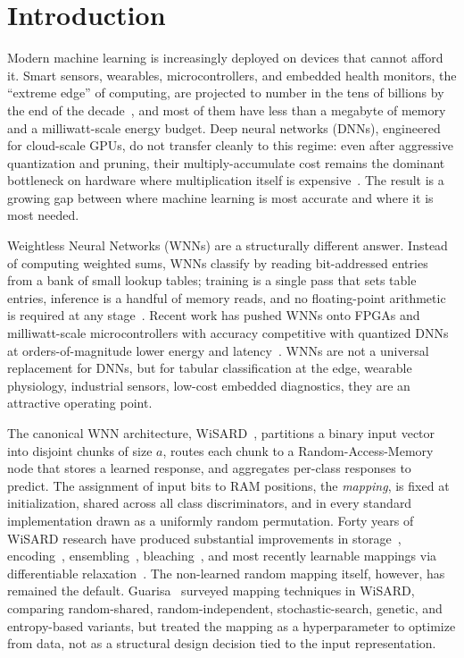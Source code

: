 
\section{Introduction}
\label{sec:introduction}

Modern machine learning is increasingly deployed on devices that cannot afford it. Smart sensors, wearables, microcontrollers, and embedded health monitors, the ``extreme edge'' of computing, are projected to number in the tens of billions by the end of the decade~\cite{tinyml-survey}, and most of them have less than a megabyte of memory and a milliwatt-scale energy budget. Deep neural networks (DNNs), engineered for cloud-scale GPUs, do not transfer cleanly to this regime: even after aggressive quantization and pruning, their multiply-accumulate cost remains the dominant bottleneck on hardware where multiplication itself is expensive~\cite{efficient_dl}. The result is a growing gap between where machine learning is most accurate and where it is most needed.

Weightless Neural Networks (WNNs) are a structurally different answer. Instead of computing weighted sums, WNNs classify by reading bit-addressed entries from a bank of small lookup tables; training is a single pass that sets table entries, inference is a handful of memory reads, and no floating-point arithmetic is required at any stage~\cite{aleksander1984wisard}. Recent work has pushed WNNs onto FPGAs and milliwatt-scale microcontrollers with accuracy competitive with quantized DNNs at orders-of-magnitude lower energy and latency~\cite{susskind2022bthowen,susskind2023uleen,bacellar2024dwn}. WNNs are not a universal replacement for DNNs, but for tabular classification at the edge, wearable physiology, industrial sensors, low-cost embedded diagnostics, they are an attractive operating point.

The canonical WNN architecture, WiSARD~\cite{aleksander1984wisard}, partitions a binary input vector into disjoint chunks of size $a$, routes each chunk to a Random-Access-Memory node that stores a learned response, and aggregates per-class responses to predict. The assignment of input bits to RAM positions, the \emph{mapping}, is fixed at initialization, shared across all class discriminators, and in every standard implementation drawn as a uniformly random permutation. Forty years of WiSARD research have produced substantial improvements in storage~\cite{santiago2020bloom,bacellar2022logicwisard}, encoding~\cite{lima2020distributive}, ensembling~\cite{cardoso2017clus,susskind2023uleen,lusquino2021thesis}, bleaching~\cite{grieco2010producing}, and most recently learnable mappings via differentiable relaxation~\cite{bacellar2024dwn}. The non-learned random mapping itself, however, has remained the default. Guarisa~\cite{guarisa2020thesis} surveyed mapping techniques in WiSARD, comparing random-shared, random-independent, stochastic-search, genetic, and entropy-based variants, but treated the mapping as a hyperparameter to optimize from data, not as a structural design decision tied to the input representation.

